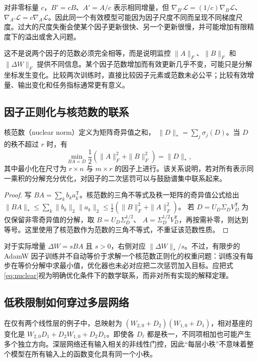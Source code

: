 \documentclass[UTF8,12pt,a4paper,fontset=fandol]{ctexart}
\begin{document}
对非零标量 $c$，$B'=cB$、$A'=A/c$ 表示相同增量，但
$\nabla_{B'}\mathcal L=(1/c)\nabla_B\mathcal L$、
$\nabla_{A'}\mathcal L=c\nabla_A\mathcal L$。因此同一个有效模型可能因为因子尺度不同而呈现不同梯度尺度。过大的尺度失衡会使某个因子更新很快、另一个更新很慢，并可能增加有限精度下的溢出或舍入问题。

这不是说两个因子的范数必须完全相等，而是说明监控 $\|A\|_F$、$\|B\|_F$ 和 $\|\Delta W\|_F$ 提供不同信息。某个因子范数增加而有效更新几乎不变，可能只是分解坐标发生变化。比较两次训练时，直接比较因子元素或范数未必公平；比较有效增量、输出变化和任务指标通常更有意义。

\subsection{因子正则化与核范数的联系}

核范数（nuclear norm）定义为矩阵奇异值之和，
$\|D\|_*=\sum_j\sigma_j(D)$。当 $D$ 的秩不超过 $r$ 时，有
\begin{equation}
\min_{BA=D}\frac12\left(\|A\|_F^2+\|B\|_F^2\right)=\|D\|_*,
\label{eq:nuclear}
\end{equation}
其中最小化在尺寸为 $r\times n$ 与 $m\times r$ 的因子上进行。该关系说明，若对所有表示同一乘积的分解充分优化，对因子的二次惩罚可以与鼓励谱集中联系起来。

\begin{proof}
写 $BA=\sum_kb_ka_k^{\mathsf T}$。核范数的三角不等式及秩一矩阵的奇异值公式给出
$\|BA\|_*\leq\sum_k\|b_k\|_2\|a_k\|_2
\leq\frac12(\|B\|_F^2+\|A\|_F^2)$。
若 $D=U_D\Sigma_DV_D^{\mathsf T}$ 为仅保留非零奇异值的分解，取
$B=U_D\Sigma_D^{1/2}$、
$A=\Sigma_D^{1/2}V_D^{\mathsf T}$，再按需补零，则达到等号。这里使用了核范数作为范数的三角不等式，不重证该范数性质。
\end{proof}

对于实际增量 $\Delta W=sBA$ 且 $s>0$，右侧对应
$\|\Delta W\|_*/s$。不过，有限步的 AdamW 因子训练并不自动等价于求解一个核范数正则化的权重问题：训练没有每步在等价分解中求最小值，优化器也未必对应把二次惩罚加入目标。应把式\eqref{eq:nuclear}视为明确优化条件下的数学联系，而非对所有实现的解释定理。

\subsection{低秩限制如何穿过多层网络}

在仅有两个线性层的例子中，总映射为
$(W_{2,0}+D_2)(W_{1,0}+D_1)$，相对基座的变化是
$W_{2,0}D_1+D_2W_{1,0}+D_2D_1$。即使各 $D_\ell$ 都是秩一，不同项相加也可能产生多个独立方向。深层网络还有输入相关的非线性门控，因此“每层小秩”不意味着整个模型在所有输入上的函数变化具有同一个小秩。
\end{document}
